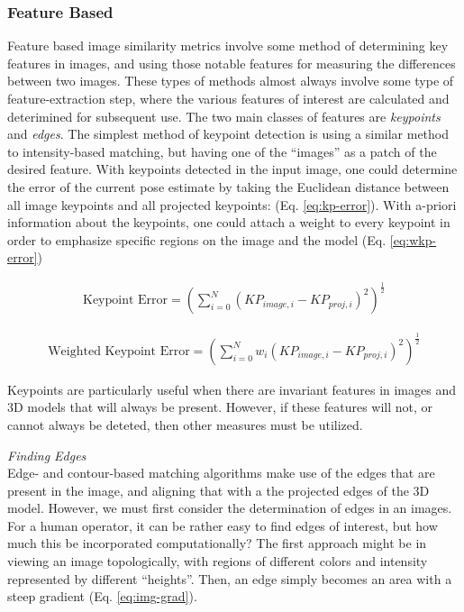 \subsubsection{Feature Based}
Feature based image similarity metrics involve some method of determining key features in images, and using those notable features for measuring the differences between two images. These types of methods almost always involve some type of feature-extraction step, where the various features of interest are calculated and deterimined for subsequent use. The two main classes of features are \emph{keypoints} and \emph{edges}. The simplest method of keypoint detection is using a similar method to intensity-based matching, but having one of the ``images'' as a patch of the desired feature. With keypoints detected in the input image, one could determine the error of the current pose estimate by taking the Euclidean distance between all image keypoints and all projected keypoints: \cite{burtonAutomaticTrackingHealthy2021} (Eq. \ref{eq:kp-error}). With a-priori information about the keypoints, one could attach a weight to every keypoint in order to emphasize specific regions on the image and the model (Eq. \ref{eq:wkp-error})

\begin{equation}
    \begin{aligned}
        \text{Keypoint Error}= (\sum_{i = 0}^{N}(KP_{image,i} - KP_{proj,i})^2)^{\frac{1}{2}}
    \end{aligned}
    \label{eq:kp-error}
\end{equation}

\begin{equation}
    \begin{aligned}
        \text{Weighted Keypoint Error} = (\sum_{i = 0}^{N}w_{i}(KP_{image,i} - KP_{proj,i})^2)^{\frac{1}{2}}
    \end{aligned}
    \label{eq:wkp-error}
\end{equation}

Keypoints are particularly useful when there are invariant features in images and 3D models that will always be present. However, if these features will not, or cannot always be deteted, then other measures must be utilized.

\emph{Finding Edges}\\
Edge- and contour-based matching algorithms make use of the edges that are present in the image, and aligning that with a the projected edges of the 3D model. However, we must first consider the determination of edges in an images. For a human operator, it can be rather easy to find edges of interest, but how much this be incorporated computationally? The first approach might be in viewing an image topologically, with regions of different colors and intensity represented by different ``heights''. Then, an edge simply becomes an area with a steep gradient (Eq. \ref{eq:img-grad}).

